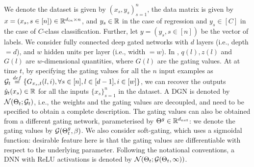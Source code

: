 We denote the dataset is given by $(x_s,y_s)_{s=1}^n$, the data matrix is given by $x=(x_s,s\in[n])\in\mathbb{R}^{d_{in}\times n}$, and $y_s\in\mathbb{R}$ in the case of regression and $y_s\in[C]$ in the case of $C$-class classification. Further, let $y=(y_s,s\in[n])$ be the vector of labels. We consider fully connected deep gated networks with $d$ layers (i.e., depth $=d$), and $w$ hidden units per layer (i.e., width $=w$). In , $q(l),z(l)$ and $G(l)$ are $w$-dimensional quantities, where $G(l)$ are the gating values.  At at time $t$, by specifying the gating values for all the $n$ input examples as $\mathcal{G}_t\stackrel{def}=\{G_{x_{s},t}(l,i), \forall s\in[n],l\in[d-1],i\in[w]\}$, we can recover the outputs $\hat{y}_t(x_s)\in \mathbb{R}$ for all the inputs $\{x_s\}_{s=1}^n$ in the dataset.  A DGN is denoted by $\mathcal{N}(\Theta_t;\mathcal{G}_t)$, i.e., the weights and the gating values are decoupled, and need to be specified to obtain a complete description. The gating values can also be obtained from a different gating network, parameterised by ${\Theta}^g\in\mathbb{R}^{d_{net}}$: we denote the gating values by $\mathcal{G}({\Theta}^g_t,\beta)$. We also consider soft-gating, which uses a sigmoidal function: desirable feature here is that the gating values are differentiable with respect to the underlying parameter. Following the notational conventions, a DNN with ReLU activations is denoted by $\mathcal{N}(\Theta_t;\mathcal{G}(\Theta_t,\infty))$.
